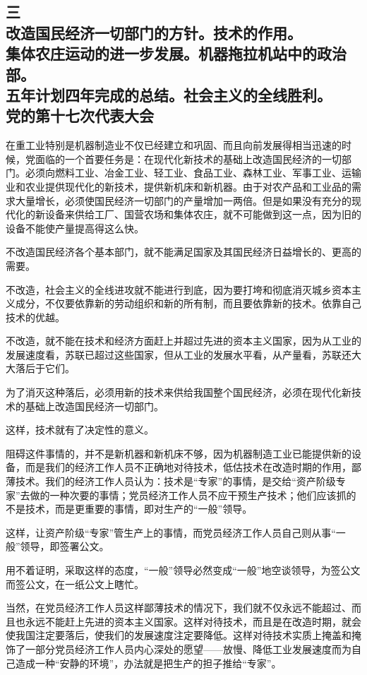 \subsection[三\q 改造国民经济一切部门的方针。技术的作用。集体农庄运动的进一步发展。机器拖拉机站中的政治部。五年计划四年完成的总结。社会主义的全线胜利。党的第十七次代表大会]{三\\改造国民经济一切部门的方针。技术的作用。\\集体农庄运动的进一步发展。机器拖拉机站中的政治部。\\五年计划四年完成的总结。社会主义的全线胜利。\\党的第十七次代表大会}

在重工业特别是机器制造业不仅已经建立和巩固、而且向前发展得相当迅速的时候，党面临的一个首要任务是：在现代化新技术的基础上改造国民经济的一切部门。必须向燃料工业、冶金工业、轻工业、食品工业、森林工业、军事工业、运输业和农业提供现代化的新技术，提供新机床和新机器。由于对农产品和工业品的需求大量增长，必须使国民经济一切部门的产量增加一两倍。但是如果没有充分的现代化的新设备来供给工厂、国营农场和集体农庄，就不可能做到这一点，因为旧的设备不能使产量提高得这么快。

不改造国民经济各个基本部门，就不能满足国家及其国民经济日益增长的、更高的需要。

不改造，社会主义的全线进攻就不能进行到底，因为要打垮和彻底消灭城乡资本主义成分，不仅要依靠新的劳动组织和新的所有制，而且要依靠新的技术。依靠自己技术的优越。

不改造，就不能在技术和经济方面赶上并超过先进的资本主义国家，因为从工业的发展速度看，苏联已超过这些国家，但从工业的发展水平看，从产量看，苏联还大大落后于它们。

为了消灭这种落后，必须用新的技术来供给我国整个国民经济，必须在现代化新技术的基础上改造国民经济一切部门。

这样，技术就有了决定性的意义。

阻碍这件事情的，并不是新机器和新机床不够，因为机器制造工业已能提供新的设备，而是我们的经济工作人员不正确地对待技术，低估技术在改造时期的作用，鄙薄技术。我们的经济工作人员认为：技术是“专家”的事情，是交给“资产阶级专家”去做的一种次要的事情；党员经济工作人员不应干预生产技术；他们应该抓的不是技术，而是更重要的事情，即对生产的“一般”领导。

这样，让资产阶级“专家”管生产上的事情，而党员经济工作人员自己则从事“一般”领导，即签署公文。

用不着证明，采取这样的态度，“一般”领导必然变成“一般”地空谈领导，为签公文而签公文，在一纸公文上瞎忙。

当然，在党员经济工作人员这样鄙薄技术的情况下，我们就不仅永远不能超过、而且也永远不能赶上先进的资本主义国家。这样对待技术，而且是在改造时期，就会使我国注定要落后，使我们的发展速度注定要降低。这样对待技术实质上掩盖和掩饰了一部分党员经济工作人员内心深处的愿望——放慢、降低工业发展速度而为自己造成一种“安静的环境”，办法就是把生产的担子推给“专家”。

